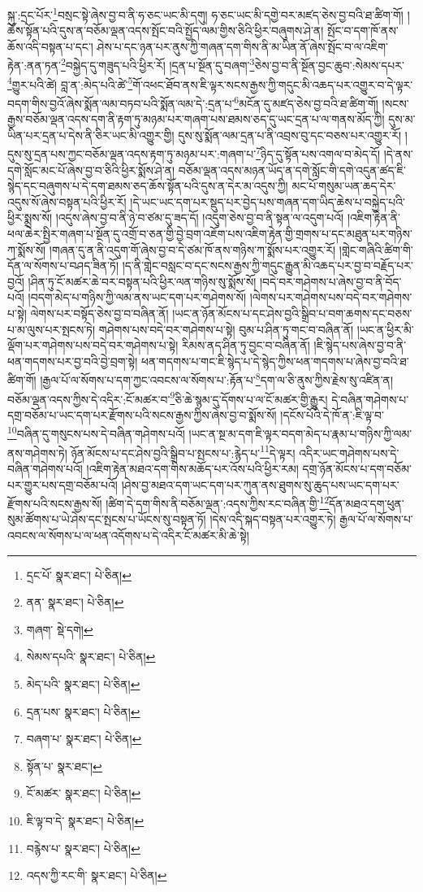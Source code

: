 སྐུ་:དྲང་པོར་\footnote{དྲང་པོ་  སྣར་ཐང་།  པེ་ཅིན། }བསྲང་སྟེ་ཞེས་བྱ་བ་ནི་ཧ་ཅང་ཡང་མི་དགུ། ཧ་ཅང་ཡང་མི་དགྱེ་བར་མཛད་ཅེས་བྱ་བའི་ཐ་ཚིག་གོ། །ཆོས་སྟོན་པའི་དུས་ན་བཅོམ་ལྡན་འདས་སྤོང་བའི་སྤྱོད་ལམ་གྱིས་ཅིའི་ཕྱིར་བཞུགས་ཤེ་ན། སྤོང་བ་དག་ཁོ་ནས་ཆོས་འདི་བསྟན་པ་དང་། ཤེས་པ་དང་ཉན་པར་ནུས་ཀྱི་གཞན་དག་གིས་ནི་མ་ཡིན་ནོ་ཞེས་སྤོང་བ་ལ་འཇིག་རྟེན་:ནན་ཏན་\footnote{ནན་  སྣར་ཐང་།  པེ་ཅིན། }བསྐྱེད་དུ་གཟུད་པའི་ཕྱིར་རོ། །དྲན་པ་སྔོན་དུ་བཞག་\footnote{གཞག་  སྡེ་དགེ། }ཅེས་བྱ་བ་ནི་སྔོན་བྱང་ཆུབ་:སེམས་དཔར་\footnote{སེམས་དཔའི་  སྣར་ཐང་།  པེ་ཅིན། }གྱུར་པའི་ཚེ། བླ་ན་:མེད་པའི་ཚེ་\footnote{མེད་པའི་  སྣར་ཐང་།  པེ་ཅིན། }གོ་འཕང་ཐོབ་ནས་ཇི་ལྟར་སངས་རྒྱས་ཀྱི་གདུང་མི་འཆད་པར་འགྱུར་བ་དེ་ལྟར་བདག་གིས་བྱའོ་ཞེས་སྨོན་ལམ་བཏབ་པའི་སྨོན་ལམ་དེ་:དྲན་པ་\footnote{དྲན་པས་  སྣར་ཐང་།  པེ་ཅིན། }མངོན་དུ་མཛད་ཅེས་བྱ་བའི་ཐ་ཚིག་གོ། །སངས་རྒྱས་བཅོམ་ལྡན་འདས་དག་ནི་རྟག་ཏུ་མཉམ་པར་གཞག་པས་ཐམས་ཅད་དུ་ཡང་དྲན་པ་ལ་གནས་མོད་ཀྱི། དུས་མ་ཡིན་པར་དྲན་པ་དེས་ནི་ཅིར་ཡང་མི་འགྱུར་གྱི། དུས་སུ་སྨོན་ལམ་དྲན་པ་ནི་འབྲས་བུ་དང་བཅས་པར་འགྱུར་རོ། །དུས་སུ་དྲན་པས་ཀྱང་བཅོམ་ལྡན་འདས་རྟག་ཏུ་མཉམ་པར་:གཞག་པ་\footnote{བཞག་པ་  སྣར་ཐང་།  པེ་ཅིན། }ཉིད་དུ་སྟོན་པས་འགལ་བ་མེད་དོ། །དེ་ནས་དགེ་སློང་མང་པོ་ཞེས་བྱ་བ་ཅིའི་ཕྱིར་སྨོས་ཤེ་ན། བཅོམ་ལྡན་འདས་མཉན་ཡོད་ན་དགེ་སློང་གི་དགེ་འདུན་ཚད་ཇི་སྙེད་དང་བཞུགས་པ་དེ་དག་ཐམས་ཅད་ཆོས་སྟོན་པའི་དུས་ན་དེར་མ་འདུས་ཀྱི། མང་པོ་གསུམ་ཡན་ཆད་དེར་འདུས་སོ་ཞེས་བསྟན་པའི་ཕྱིར་རོ། །དེ་ཡང་ཡང་དག་པར་སྡུད་པར་བྱེད་པས་གཞན་དག་ཡིད་ཆེས་པ་བསྐྱེད་པའི་ཕྱིར་སྨྲས་སོ། །འདུས་ཞེས་བྱ་བ་ནི་ཉེ་བ་ཙམ་དུ་ཟད་དོ། །འདུག་ཅེས་བྱ་བ་ནི་སྟན་ལ་འདུག་པའོ། །འཇིག་རྟེན་ནི་ཕལ་ཆེར་སྤྱིར་གཞག་པ་སྔོན་དུ་འགྲོ་བ་ཅན་གྱི་བྱེ་བྲག་འཇོག་པས་འཇིག་རྟེན་གྱི་གྲགས་པ་དང་མཐུན་པར་གཉིས་ཀ་སྨོས་སོ། །གཞན་དུ་ན་ནི་འདུག་གོ་ཞེས་བྱ་བ་དེ་ཙམ་ཁོ་ནས་གཉིས་ཀ་སྨོས་པར་འགྱུར་རོ། །གླེང་གཞིའི་ཚིག་གི་དོན་ལ་སོགས་པ་བཤད་ཟིན་ཏོ། །ད་ནི་གླེང་བསླང་བ་དང་སངས་རྒྱས་ཀྱི་གདུང་རྒྱུན་མི་འཆད་པར་བྱ་བ་བརྗོད་པར་བྱའོ། །ཤིན་ཏུ་ངོ་མཚར་ཆེ་བར་བསྟན་པའི་ཕྱིར་ལན་གཉིས་སུ་སྨོས་སོ། །བདེ་བར་གཤེགས་པ་ཞེས་བྱ་བ་ནི་བོད་པའོ། །བདག་མེད་པ་གཉིས་ཀྱི་ལམ་ནས་ཡང་དག་པར་གཤེགས་སོ། །ལེགས་པར་གཤེགས་པས་བདེ་བར་གཤེགས་པ་སྟེ། ལེགས་པར་བསྟོད་ཅེས་བྱ་བ་བཞིན་ནོ། །ཡང་ན་ཉོན་མོངས་པ་དང་ཤེས་བྱའི་སྒྲིབ་པ་བག་ཆགས་དང་བཅས་པ་མ་ལུས་པར་སྤངས་ཏེ། གཤེགས་པས་བདེ་བར་གཤེགས་པ་སྟེ། བུམ་པ་ཤིན་ཏུ་གང་བ་བཞིན་ནོ། །ཡང་ན་ཕྱིར་མི་ལྡོག་པར་གཤེགས་པས་བདེ་བར་གཤེགས་པ་སྟེ། རིམས་ནད་ཤིན་ཏུ་བྱང་བ་བཞིན་ནོ། །ཇི་སྙེད་པས་ཞེས་བྱ་བ་ནི་ཕན་གདགས་པར་བྱ་བའི་བྱེ་བྲག་སྟེ། ཕན་གདགས་པ་གང་ཇི་སྙེད་པ་དེ་སྙེད་ཀྱིས་ཕན་གདགས་པ་ཞེས་བྱ་བའི་ཐ་ཚིག་གོ། །རྒྱལ་པོ་ལ་སོགས་པ་དག་ཀྱང་འབངས་ལ་སོགས་པ་:རྟོན་པ་\footnote{སྟོན་པ་  སྣར་ཐང་། }དག་ལ་ཅི་ནུས་ཀྱིས་རྗེས་སུ་འཛིན་ན། བཅོམ་ལྡན་འདས་ཀྱིས་དེ་འདིར་:ངོ་མཚར་བ་\footnote{ངོ་མཚར་  སྣར་ཐང་།  པེ་ཅིན། }ཅི་ཆེ་སྙམ་དུ་དོགས་པ་ལ་ངོ་མཚར་གྱི་རྒྱུར། དེ་བཞིན་གཤེགས་པ་དགྲ་བཅོམ་པ་ཡང་དག་པར་རྫོགས་པའི་སངས་རྒྱས་ཀྱིས་ཞེས་བྱ་བ་སྨོས་སོ། །དངོས་པོའི་དེ་ཁོ་ན་:ཇི་ལྟ་བ་\footnote{ཇི་ལྟ་བ་དེ་  སྣར་ཐང་།  པེ་ཅིན། }བཞིན་དུ་གསུངས་པས་དེ་བཞིན་གཤེགས་པའོ། །ཡང་ན་སྔ་མ་དག་ཇི་ལྟར་བདག་མེད་པ་རྣམ་པ་གཉིས་ཀྱི་ལམ་ནས་གཤེགས་ཏེ། ཉོན་མོངས་པ་དང་ཤེས་བྱའི་སྒྲིབ་པ་སྤངས་པ་:རྙེད་པ་\footnote{བརྙེས་པ་  སྣར་ཐང་།  པེ་ཅིན། }དེ་ལྟར། འདིར་ཡང་གཤེགས་པས་དེ་བཞིན་གཤེགས་པའོ། །འཇིག་རྟེན་མཐའ་དག་གིས་མཆོད་པར་འོས་པའི་ཕྱིར་རམ། དགྲ་ཉོན་མོངས་པ་དག་བཅོམ་པར་གྱུར་པས་དགྲ་བཅོམ་པའོ། །ཤེས་བྱ་མཐའ་དག་ཡང་དག་པར་ཀུན་ནས་ཐུགས་སུ་ཆུད་པས་ཡང་དག་པར་རྫོགས་པའི་སངས་རྒྱས་སོ། །ཚིག་དེ་དག་གིས་ནི་བཅོམ་ལྡན་:འདས་ཀྱིས་རང་བཞིན་གྱི་\footnote{འདས་ཀྱི་རང་གི་  སྣར་ཐང་།  པེ་ཅིན། }དོན་མཐའ་དག་ཕུན་སུམ་ཚོགས་པ་ཡེ་ཤེས་དང་སྤངས་པ་ཡོངས་སུ་བསྟན་ཏོ། །དེས་འདི་སྐད་བསྟན་པར་འགྱུར་ཏེ། རྒྱལ་པོ་ལ་སོགས་པ་འབངས་ལ་སོགས་པ་ལ་ཕན་འདོགས་པ་དེ་འདིར་ངོ་མཚར་མི་ཆེ་སྟེ། 
